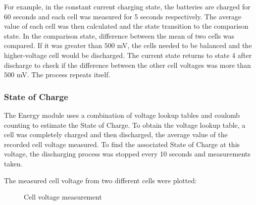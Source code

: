 \documentclass[11pt, a4paper]{article}
\begin{document}
For example, in the constant current charging state, the batteries are charged for 60 seconds and each cell was measured for 5 seconds respectively. The average value of each cell was then calculated and the state transition to the comparison state. In the comparison state, difference between the mean of two cells was compared. If it was greater than $500$ mV, the cells needed to be balanced and the higher-voltage cell would be discharged. The current state returns to state 4 after discharge to check if the difference between the other cell voltages was more than $500$ mV. The process repeats itself.

\pagebreak
\subsubsection{State of Charge}

The Energy module uses a combination of voltage lookup tables and coulomb counting to estimate the State of Charge. To obtain the voltage lookup table, a cell was completely charged and then discharged, the average value of the recorded cell voltage measured. To find the associated State of Charge at this voltage, the discharging process was stopped every 10 seconds and measurements taken.

The measured cell voltage from two different cells were plotted: 
\begin{figure}[h!]
    \centering
    \qquad
    \caption{Cell voltage measurement}
    \label{fig:Cell}
\end{figure}
\end{document}
